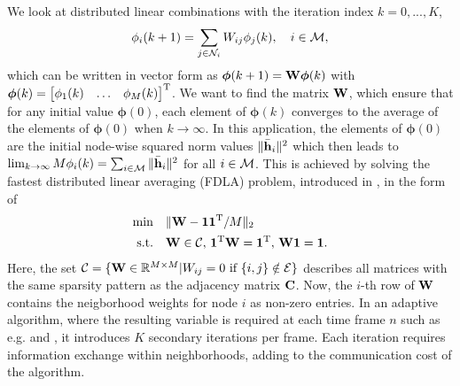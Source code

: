 \documentclass{article}
\begin{document}
We look at distributed linear combinations with the iteration index \(k=0,...,K\),
\begin{equation}
    \phi_i({k+1}) = \sum_{j \in \mathcal{N}_i} W_{ij} \phi_j({k}),\quad i\in \mathcal{M},\label{eq:adaptivenormest:distlincomb}
\end{equation}
which can be written in vector form as \(\bm{\phi}({k+1}) = \bm{\mathrm{W}} \bm{\phi}({k})\) with \(\bm{\phi}(k) = \begin{bmatrix} \phi_1(k) & \ldots & \phi_M(k) \end{bmatrix}^{\mathrm{T}}\).
We want to find the matrix \(\bm{\mathrm{W}}\), which ensure that for any initial value \(\bm{\phi}({0})\), each element of \(\bm{\phi}({k})\) converges to the average of the elements of \(\bm{\phi}({0})\) when \(k \to \infty\).
In this application, the elements of \(\bm{\phi}(0)\) are the initial node-wise squared norm values \(\|\bar{\bm{\mathrm{h}}}_i\|^2\) which then leads to \(\lim_{k \to \infty} M \phi_i(k) = \sum_{i \in \mathcal{M}} \|\bar{\bm{\mathrm{h}}}_i\|^2\) for all \(i \in \mathcal{M}\).
This is achieved by solving the fastest distributed linear averaging (FDLA) problem, introduced in \cite{xiaoFastLinearIterations2004}, in the form of
\begin{equation}
    \begin{aligned}
        \min& \quad \| \bm{\mathrm{W}} - \bm{1}\bm{1}^{\mathrm{T}}/M\|_2\\
        \text{s.t.}& \quad \bm{\mathrm{W}} \in \mathcal{C},\, \bm{1}^{\mathrm{T}} \bm{\mathrm{W}} = \bm{1}^{\mathrm{T}},\, \bm{\mathrm{W}} \bm{1}= \bm{1}.
    \end{aligned}\label{eq:adaptivenormest:fdlaminprob}
\end{equation}
Here, the set \(\mathcal{C} = \{\bm{\mathrm{W}} \in \mathbb{R}^{M \times M} \vert W_{ij} = 0 \text{ if } \{i,j\} \notin \mathcal{E}\}\) describes all matrices with the same sparsity pattern as the adjacency matrix \(\bm{\mathrm{C}}\).
Now, the \(i\)-th row of \(\bm{\mathrm{W}}\) contains the neigborhood weights for node \(i\) as non-zero entries.
In an adaptive algorithm, where the resulting variable is required at each time frame \(n\) such as e.g. \cite{yuDistributedBlindSystem2014, liuDistributedBlindIdentification2016} and \cite{blochbergerDBSI}, it introduces \(K\) secondary iterations per frame.
Each iteration requires information exchange within neighborhoods, adding to the communication cost of the algorithm.
\end{document}
